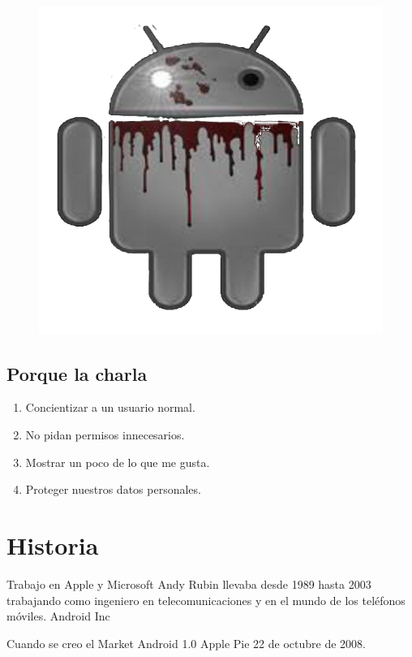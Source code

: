 \documentclass[12pt]{beamer} %
\begin{document}
\begin{slide}
  \begin{figure}[h]
      \includegraphics[height=0.9\textheight]{img/zomdroid.png}
    \end{figure}
\end{slide}
\subsection{Porque la charla}
\begin{slide}
 
  \begin{enumerate}
    \item Concientizar a un usuario normal.\pause
    \item No pidan permisos innecesarios.\pause
    \item Mostrar un poco de lo que me gusta.\pause
    \item Proteger nuestros datos personales.
  \end{enumerate}
\end{slide}


\section{Historia}


\begin{slide}

  \begin{block}{Trabajo en Apple y Microsoft}
   Andy Rubin llevaba desde 1989 hasta 2003 trabajando como ingeniero en telecomunicaciones y en el mundo de los teléfonos móviles. Android Inc\pause
  \end{block}

  \begin{alertblock}{Cuando se creo el Market}
    Android 1.0 Apple Pie 22 de octubre de 2008.
  \end{alertblock}

\end{slide}
\end{document}
